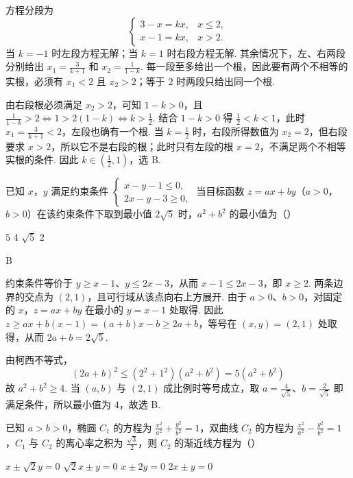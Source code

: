 \begin{solution}
方程分段为
\[
\begin{cases}
3-x=kx,&x\leqslant2,\\
x-1=kx,&x>2.
\end{cases}
\]
当 \(k=-1\) 时左段方程无解；当 \(k=1\) 时右段方程无解. 其余情况下，左、右两段分别给出
\(x_1=\frac{3}{k+1}\) 和 \(x_2=\frac{1}{1-k}\). 每一段至多给出一个根，因此要有两个不相等的实根，必须有 \(x_1<2\) 且 \(x_2>2\)；等于 \(2\) 时两段只给出同一个根.

由右段根必须满足 \(x_2>2\)，可知 \(1-k>0\)，且
\(\frac{1}{1-k}>2\Longleftrightarrow 1>2(1-k)\Longleftrightarrow k>\frac12\). 结合 \(1-k>0\) 得 \(\frac12<k<1\)，此时 \(x_1=\frac{3}{k+1}<2\)，左段也确有一个根. 当 \(k=\frac12\) 时，右段所得数值为 \(x_2=2\)，但右段要求 \(x>2\)，所以它不是右段的根；此时只有左段的根 \(x=2\)，不满足两个不相等实根的条件. 因此 \(k\in\left(\frac12,1\right)\)，选 B.
\end{solution}

\begin{problem}
已知 \(x\)，\(y\) 满足约束条件 \(\begin{cases}
x - y - 1 \leqslant 0,\\
2x - y - 3 \geqslant 0,
\end{cases}\) 当目标函数 \(z = ax + by\)（\(a > 0\)，\(b > 0\)）在该约束条件下取到最小值 \(2\sqrt{5}\) 时，\(a^2 + b^2\) 的最小值为（\quad）

\choices
    {\(5\)}
    {\(4\)}
    {\(\sqrt{5}\)}
    {\(2\)}
\end{problem}

\begin{answer}
B
\end{answer}

\begin{solution}
约束条件等价于 \(y\geqslant x-1\)、\(y\leqslant2x-3\)，从而 \(x-1\leqslant2x-3\)，即 \(x\geqslant2\). 两条边界的交点为 \((2,1)\)，且可行域从该点向右上方展开. 由于 \(a>0\)、\(b>0\)，对固定的 \(x\)，\(z=ax+by\) 在最小的 \(y=x-1\) 处取得. 因此
\(z\geqslant ax+b(x-1)=(a+b)x-b\geqslant2a+b\)，等号在 \((x,y)=(2,1)\) 处取得，从而 \(2a+b=2\sqrt5\).

由柯西不等式，
\[
(2a+b)^2\leqslant(2^2+1^2)(a^2+b^2)=5(a^2+b^2)
\]
故 \(a^2+b^2\geqslant4\). 当 \((a,b)\) 与 \((2,1)\) 成比例时等号成立，取
\(a=\frac4{\sqrt5}\)、\(b=\frac2{\sqrt5}\) 即满足条件，所以最小值为 \(4\)，故选 B.
\end{solution}

\begin{problem}
已知 \(a > b > 0\)，椭圆 \(C_1\) 的方程为 \(\frac{x^2}{a^2} + \frac{y^2}{b^2} = 1\)，双曲线 \(C_2\) 的方程为 \(\frac{x^2}{a^2} - \frac{y^2}{b^2} = 1\)，\(C_1\) 与 \(C_2\) 的离心率之积为 \(\frac{\sqrt{3}}{2}\)，则 \(C_2\) 的渐近线方程为（\quad）

\choices
    {\(x \pm \sqrt{2}y = 0\)}
    {\(\sqrt{2}x \pm y = 0\)}
    {\(x \pm 2y = 0\)}
    {\(2x \pm y = 0\)}
\end{problem}

